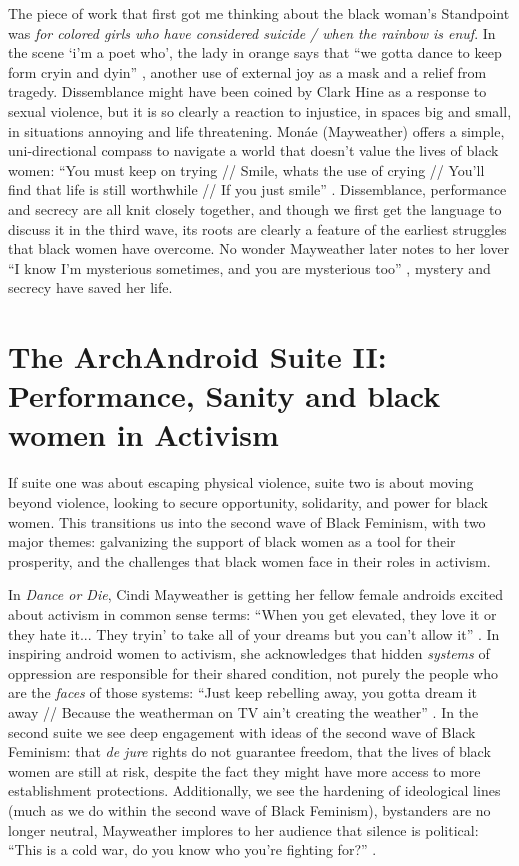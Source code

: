 \documentclass[a4paper, 11pt]{article} %
\begin{document}
The piece of work that first got me thinking about the black woman's Standpoint was \emph{for colored girls who have considered suicide / when the rainbow is enuf}.
In the scene `i'm a poet who', the lady in orange says that ``we gotta dance to keep form cryin and dyin'' \cite{forcoloredgirls}, another use of external joy as a mask and a relief from tragedy.
Dissemblance might have been coined by Clark Hine as a response to sexual violence, but it is so clearly a reaction to injustice, in spaces big and small, in situations annoying and life threatening.
Mon\'ae (Mayweather) offers a simple, uni-directional compass to navigate a world that doesn't value the lives of black women:
``You must keep on trying // Smile, whats the use of crying // You'll find that life is still worthwhile // If you just smile'' \cite{smile}.
Dissemblance, performance and secrecy are all knit closely together, and though we first get the language to discuss it in the third wave, its roots are clearly a feature of the earliest struggles that black women have overcome.
No wonder Mayweather later notes to her lover ``I know I'm mysterious sometimes, and you are mysterious too'' \cite{primetime},
mystery and secrecy have saved her life.


\section*{The ArchAndroid Suite II: Performance, Sanity and black women in Activism}

If suite one was about escaping physical violence, suite two is about moving beyond violence, looking to secure opportunity, solidarity, and power for black women.
This transitions us into the second wave of Black Feminism, with two major themes: galvanizing the support of black women as a tool for their prosperity, and the challenges that black women face in their roles in activism.

In \emph{Dance or Die}, Cindi Mayweather is getting her fellow female androids excited about activism in common sense terms:
``When you get elevated, they love it or they hate it... They tryin' to take all of your dreams but you can't allow it'' \cite{tightrope}.
In inspiring android women to activism, she acknowledges that hidden \emph{systems} of oppression are responsible for their shared condition, not purely the people who are the \emph{faces} of those systems:
``Just keep rebelling away, you gotta dream it away // Because the weatherman on TV ain't creating the weather'' \cite{danceordie}. 
In the second suite we see deep engagement with ideas of the second wave of Black Feminism: that \emph{de jure} rights do not guarantee freedom, that the lives of black women are still at risk, despite the fact they might have more access to more establishment protections.
Additionally, we see the hardening of ideological lines (much as we do within the second wave of Black Feminism), bystanders are no longer neutral, Mayweather implores to her audience that silence is political:
``This is a cold war, do you know who you're fighting for?'' \cite{coldwar}.
\end{document}

